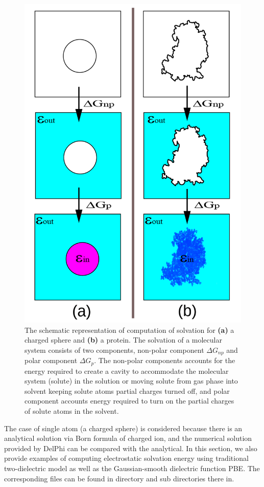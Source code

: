 \documentclass[9pt,tutorial,pubversion]{livecoms}
\newcommand*\ttvar[1]{\texttt{\expandafter\dottvar\detokenize{#1}\relax}}
\newcommand*\dottvar[1]{\ifx\relax#1\else
  \expandafter\ifx\string_#1\string_\allowbreak\else#1\fi
  \expandafter\dottvar\fi}
\begin{document}
\begin{figure}[hbt!]
\includegraphics[width=\linewidth]{Figure_5.png}
\caption{The schematic representation of computation of solvation for  \textbf{(a)} a charged sphere and \textbf{(b)} a protein. The solvation of a molecular system consists of two  components, non-polar component $ \Delta G_{np} $ and polar component $ \Delta G_p $. The non-polar components accounts for the energy required to create a cavity to accommodate the molecular system (solute) in the solution or moving solute from gas phase into solvent keeping solute atoms partial charges turned off, and polar component accounts energy required to turn on the partial charges of solute atoms in the solvent.}
\label{fig:scheme_polar_solvation}
\end{figure}

The case of single atom (a charged sphere) is considered because there is an analytical solution via Born formula of charged ion, and the numerical solution provided by DelPhi can be compared with the analytical. In this section, we also provide examples of computing electrostatic solvation energy using traditional two-dielectric model as well as the Gaussian-smooth dielectric function PBE. The corresponding files can be found in directory \ttvar{Example_3.1.1/} and sub directories there in.
\end{document}
